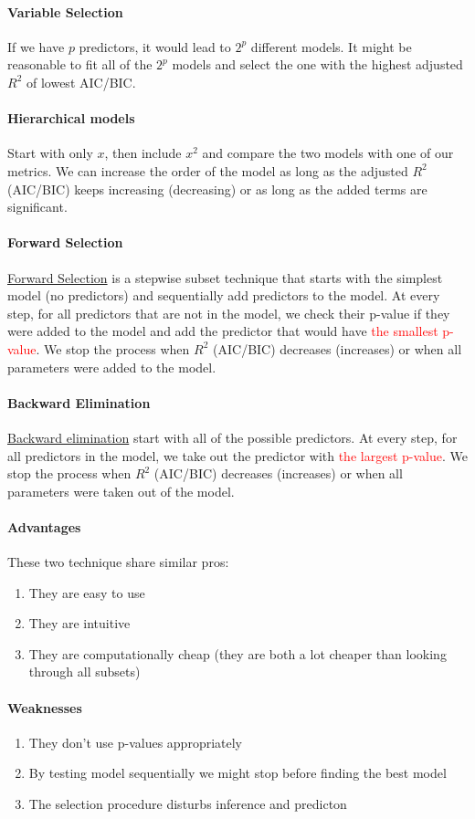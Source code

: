 \documentclass[11pt]{article}
\newcommand{\under}[1]{\underline{#1}}
\begin{document}
\paragraph{Variable Selection}
If we have $p$ predictors, it would lead to $2^p$ different models. It might be reasonable to fit all of the $2^p$ models and select the one with the highest adjusted $R^2$ of lowest AIC/BIC.
\paragraph{Hierarchical models}
Start with only $x$, then include $x^2$ and compare the two models with one of our metrics. We can increase the order of the model as long as the adjusted $R^2$ (AIC/BIC) keeps increasing (decreasing) or as long as the added terms are significant.
\paragraph{Forward Selection}
\under{Forward Selection} is a stepwise subset technique that starts with the simplest model (no predictors) and sequentially add predictors to the model. At every step, for all predictors that are not in the model, we check their p-value if they were added to the model and add the predictor that would have \textcolor{red}{the smallest p-value}. We stop the process when $R^2$ (AIC/BIC) decreases (increases) or when all parameters were added to the model.
\paragraph{Backward Elimination}
\under{Backward elimination} start with all of the possible predictors. At every step, for all predictors in the model, we take out the predictor with \textcolor{red}{the largest p-value}. We stop the process when $R^2$ (AIC/BIC) decreases (increases) or when all parameters were taken out of the model.
\paragraph{Advantages}
These two technique share similar pros:
\begin{enumerate}
	\item They are easy to use
	\item They are intuitive
	\item They are computationally cheap (they are both a lot cheaper than looking through all subsets)
\end{enumerate}
\paragraph{Weaknesses}
\begin{enumerate}
	\item They don't use p-values appropriately
	\item By testing model sequentially we might stop before finding the best model
	\item The selection procedure disturbs inference and predicton
\end{enumerate}
\end{document}
